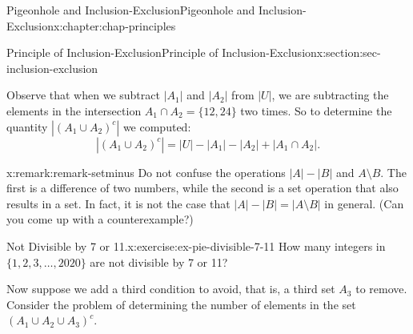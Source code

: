 \documentclass[oneside,10pt,]{book}
\numberwithin{equation}{section}
\begin{document}
\begin{chapterptx}{Pigeonhole and Inclusion-Exclusion}{}{Pigeonhole and Inclusion-Exclusion}{}{}{x:chapter:chap-principles}
\begin{sectionptx}{Principle of Inclusion-Exclusion}{}{Principle of Inclusion-Exclusion}{}{}{x:section:sec-inclusion-exclusion}
\begin{sidebyside}{1}{0.25}{0.25}{0}
\begin{sbspanel}{0.5}
{
}%
\end{sbspanel}%
\end{sidebyside}%
\par
Observe that when we subtract \(|A_1|\) and \(|A_2|\) from \(|U|\), we are subtracting the elements in the intersection \(A_1 \cap A_2 = \{12, 24\}\) two times. So to determine the quantity \(|(A_1 \cup A_2)^c|\) we computed:%
\begin{equation*}
|(A_1 \cup A_2)^c| = |U| - |A_1| - |A_2| + |A_1 \cap A_2|\text{.}
\end{equation*}
%
\begin{remark}{}{x:remark:remark-setminus}%
Do not confuse the operations \(|A| - |B|\) and \(A \setminus B\). The first is a difference of two numbers, while the second is a set operation that also results in a set. In fact, it is not the case that \(|A| - |B| = |A \setminus B|\) in general. (Can you come up with a counterexample?)%
\end{remark}
\begin{inlineexercise}{Not Divisible by 7 or 11.}{x:exercise:ex-pie-divisible-7-11}%
How many integers in \(\{1,2,3,\ldots,2020\}\) are not divisible by 7 or 11?%
\end{inlineexercise}
Now suppose we add a third condition to avoid, that is, a third set \(A_3\) to remove. Consider the problem of determining the number of elements in the set \((A_1 \cup A_2 \cup A_3)^c\).%
\begin{sidebyside}{1}{0.325}{0.325}{0}%
\begin{sbspanel}{0.35}%
\end{sbspanel}
\end{sidebyside}
\end{sectionptx}
\end{chapterptx}
\end{document}
